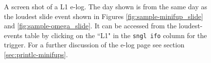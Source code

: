 \begin{figure}[p]
\label{fig:sample-elog-slide}
\center
{}
\caption{A screen shot of a L1 e-log. The day shown is from the same day as the
loudest slide event shown in Figures \ref{fig:sample-minifup_slide} and
\ref{fig:sample-omega_slide}. It can be accessed from the loudest-events table
by clicking on the ``L1" in the \texttt{sngl ifo} column for the trigger. For a
further discussion of the e-log page see section \ref{sec:printlc-minifups}.}
\end{figure}

